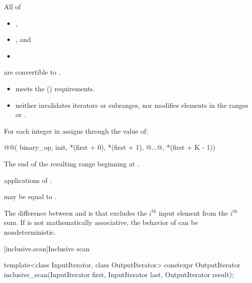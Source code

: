 \begin{itemdescr}
\pnum
\mandates
  All of
  \begin{itemize}
  \item {},
  \item {}, and
  \item {}
  \end{itemize}
  are convertible to .


\pnum
\expects
\begin{itemize}
\item
   meets the  () requirements.
\item
   neither invalidates iterators or subranges,
  nor modifies elements in
  the ranges  or .
\end{itemize}

\pnum
\effects
For each integer  in 
assigns through  the value of:
\begin{codeblock}
@@(
    binary_op, init, *(first + 0), *(first + 1), @$\dotsc$@, *(first + K - 1))
\end{codeblock}

\pnum
\returns
The end of the resulting range beginning at .

\pnum
\complexity
{} applications of .

\pnum
\remarks
{} may be equal to .

\pnum
\begin{note}
The difference between  and  is
that  excludes the $i^\text{th}$ input element
from the $i^\text{th}$ sum.
If  is not mathematically associative,
the behavior of  can be nondeterministic.
\end{note}
\end{itemdescr}

[inclusive.scan]{Inclusive scan}

%
\begin{itemdecl}
template<class InputIterator, class OutputIterator>
  constexpr OutputIterator
    inclusive_scan(InputIterator first, InputIterator last,
                   OutputIterator result);
\end{itemdecl}

